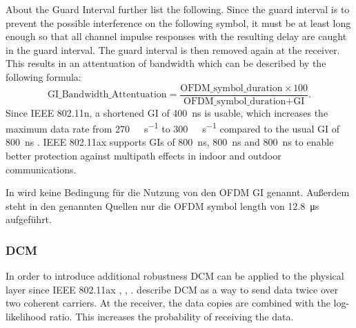 About the Guard Interval \textcite{pulimamidi_development_2007} further list the following. 
Since the guard interval is to prevent the possible interference on the following symbol, it must be at least long enough so that all channel impulse responses with the resulting delay are caught in the guard interval. 
The guard interval is then removed again at the receiver. This results in an attentuation of bandwidth which can be described by the following formula:
\begin{equation}\label{eq:GI}
	\text{GI\_Bandwidth\_Attentuation} =
	\frac{
		\text{OFDM\_symbol\_duration} \times 100
	}{
		\text{OFDM\_symbol\_duration} + \text{GI}
	}
	.
\end{equation}
Since IEEE 802.11n, a shortened \ac{GI} of \SI{400}{\nano\second} is usable, which increases the maximum data rate from \SI{270}{\mega\bit\per\second} to \SI{300}{\mega\bit\per\second} compared to the usual \ac{GI} of \SI{800}{\nano\second} \cite{sauter_wireless_2022}.  IEEE 802.11ax supports \ac{GI}s of \SI{800}{\nano\second}, \SI{800}{\nano\second} and \SI{800}{\nano\second} to enable better protection against  multipath effects in indoor and outdoor communications. 

In \cite{alleAX} wird keine Bedingung für die Nutzung von den OFDM \ac{GI} genannt. Außerdem steht in den genannten Quellen nur die \ac{OFDM} symbol length von \SI{12.8}{\micro\second} aufgeführt.

\subsubsection*{\acf{DCM}}
In order to introduce additional robustness \ac{DCM} can be applied to the physical layer since IEEE 802.11ax \cite{jacob_system-level_2020}, \cite{triwinarko_phy_2021}, \cite{noauthor_ieee_2021}. \textcite{jacob_system-level_2020} describe \ac{DCM} as a way to send data twice over two coherent carriers. At the receiver, the data copies are combined with the log-likelihood ratio. This increases the probability of receiving the data.

